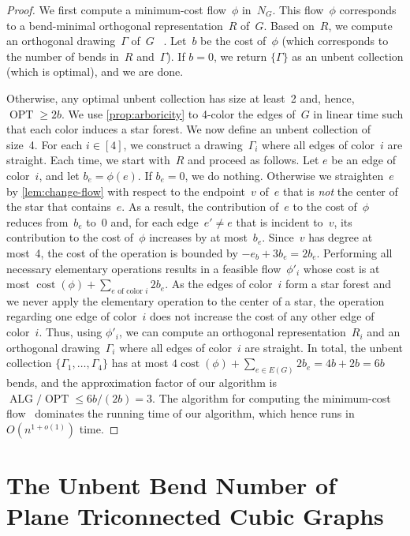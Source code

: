 \documentclass[runningheads]{llncs}
\newcommand{\opt}{\operatorname{OPT}}
\newcommand{\alg}{\operatorname{ALG}}
\newcommand{\cost}{\operatorname{cost}}
\begin{document}
\begin{proof}
  We first compute a minimum-cost flow~$\phi$ in~$N_G$.  This flow~$\phi$
  corresponds to a bend-minimal orthogonal representation~$R$ of~$G$.
  Based on~$R$, we compute an orthogonal drawing~$\Gamma$ of~$G$%
  ~\cite{t-oeggwmnb-sjc}.
  Let~$b$ be the cost of~$\phi$ (which corresponds to the number of bends
  in~$R$ and~$\Gamma$).  If $b=0$, we return $\{\Gamma\}$ as an unbent collection
  (which is optimal), and we are done.

  Otherwise, any optimal unbent collection %
  has size at least~2 and, hence, $\opt \ge 2b$.
  We use \cref{prop:arboricity} to 4-color the edges of~$G$
  in linear time such that each color induces a star forest.
  We now define an unbent collection of size~4.
  For each $i \in [4]$, we construct a drawing~$\Gamma_i$
  where all edges of color~$i$ are straight.
  Each time, we start with~$R$ and proceed as follows.
  Let $e$ be an edge of color~$i$, and let
  $b_e=\phi(e)$.  If $b_e=0$, we do nothing.  Otherwise we
  straighten~$e$ by \cref{lem:change-flow} with respect to the
  endpoint~$v$ of~$e$ that is {\em not} the center of the star that
  contains~$e$.  As a result, the contribution of~$e$ to the cost
  of~$\phi$ reduces from~$b_e$ to~0 and, for each edge~$e' \ne e$ that
  is incident to~$v$, its contribution to the cost of~$\phi$ increases
  by at most~$b_e$.  Since~$v$ has degree at most~4, the cost of the
  operation is bounded by $-e_b+3b_e=2 b_e$.  Performing all necessary
  elementary operations results
  in a feasible flow~$\phi'_i$ whose cost is at most
  $\cost(\phi)+ \sum_{e \text{ of color } i} 2b_e$.  As the edges of
  color~$i$ form a star forest and we never apply the elementary operation 
  to the center of a star, the operation regarding one edge of
  color~$i$ does not increase the cost of any other edge of color~$i$.
  Thus, using $\phi'_i$, we can compute an orthogonal
  representation~$R_i$ and an orthogonal drawing~$\Gamma_i$ where all
  edges of color~$i$ %
  are straight.
  In total, the unbent collection $\{\Gamma_1,\dots,\Gamma_4\}$ has at
  most $4 \cost(\phi) + \sum_{e \in E(G)} 2b_e = 4b+2b = 6b$ bends, and
  the approximation factor of our algorithm is
  $\alg/\opt \le 6b/(2b) = 3$.
  The algorithm for computing the minimum-cost flow~\cite{DBLP:conf/focs/Brand0PKLGSS23}
  dominates the running time of our
  algorithm, which hence runs in $O(n^{1+o(1)})$ time.
\end{proof}


\section{The Unbent Bend Number of Plane Triconnected Cubic Graphs} 
\label{se:sub-cubic}
\end{document}
